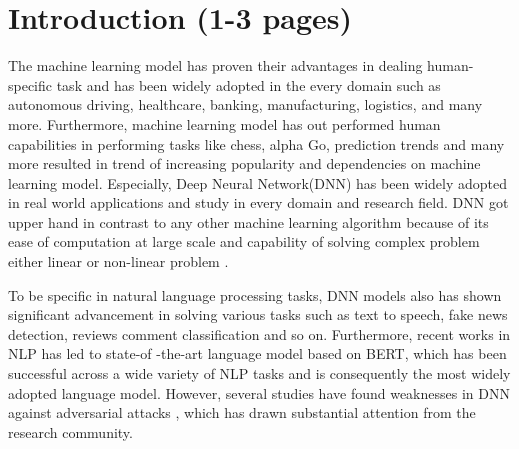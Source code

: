 \documentclass[%
	BCOR=8mm, %
	DIV=12, 
	toc=bibliography, %
	toc=listof, %
	oneside, %
	egregdoesnotlikesansseriftitles, %
	]{scrbook}
\begin{document}







\tableofcontents
\listoffigures
\listoftables

% 
\newpage


\pagestyle{headings}
\setcapindent{0pt}



\chapter{Introduction (1-3 pages)}
The machine learning model has proven their advantages in dealing human-specific task and has been widely adopted in the every domain such as autonomous driving, 
healthcare, banking, manufacturing, logistics, and many more. Furthermore, machine learning model has out performed human capabilities in performing tasks  like chess,
 alpha Go, prediction trends and many more resulted in trend of increasing popularity and dependencies on machine learning model. Especially, Deep Neural Network(DNN) 
 has been widely adopted in real world applications and study in every domain and research field. DNN got upper hand in contrast to any other machine learning algorithm 
 because of its ease of computation at large scale and capability of solving complex problem either linear or non-linear problem \cite{huq_adversarial_2020}. 

To be specific in natural language processing tasks, DNN  models also has shown significant advancement in solving various tasks such as text to speech, fake news detection, 
reviews comment classification and so on. Furthermore, recent works \cite{devlin_bert_2019,liu_roberta_2019,sanh_distilbert_2020,lan_albert_2020} in NLP has led to state-of
-the-art language model based on BERT, which has been successful across a wide variety of NLP tasks and is consequently the most widely adopted language model. However, 
several studies have found weaknesses in DNN  against adversarial attacks \cite{szegedy_intriguing_2014,yuan_adversarial_2018,akhtar_threat_2018,huq_adversarial_2020,
zhang_adversarial_2019}, which has drawn substantial attention from the research community. \\ 
\end{document}

